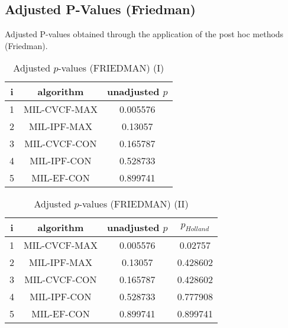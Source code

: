 \documentclass[a4paper,10pt]{article}
\begin{document}
\begin{landscape}
\newpage

\section{Adjusted P-Values (Friedman)}


Adjusted P-values obtained through the application of the post hoc methods (Friedman).

\begin{table}[!htp]
\centering\small
\begin{tabular}{ccc}
i&algorithm&unadjusted $p$\\
\hline1&MIL-CVCF-MAX&0.005576\\2&MIL-IPF-MAX&0.13057\\3&MIL-CVCF-CON&0.165787\\4&MIL-IPF-CON&0.528733\\5&MIL-EF-CON&0.899741\\\hline
\end{tabular}
\caption{Adjusted $p$-values (FRIEDMAN) (I)}
\end{table}
\begin{table}[!htp]
\centering\small
\begin{tabular}{cccc}
i&algorithm&unadjusted $p$&$p_{Holland}$\\
\hline1&MIL-CVCF-MAX&0.005576&0.02757\\2&MIL-IPF-MAX&0.13057&0.428602\\3&MIL-CVCF-CON&0.165787&0.428602\\4&MIL-IPF-CON&0.528733&0.777908\\5&MIL-EF-CON&0.899741&0.899741\\\hline
\end{tabular}
\caption{Adjusted $p$-values (FRIEDMAN) (II)}
\end{table}

\newpage
\end{landscape}
\end{document}
